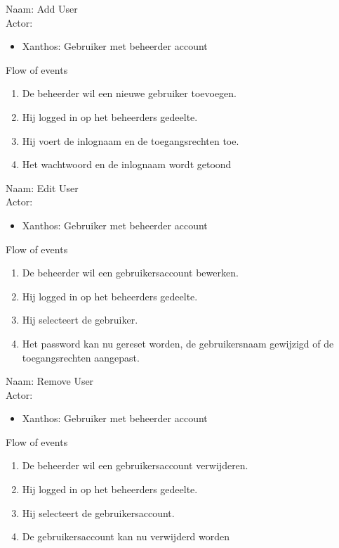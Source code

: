 \item   Naam: Add User  \\
	Actor:
	\begin{itemize}
		\item Xanthos: Gebruiker met beheerder account
	\end{itemize}
	Flow of events
	\begin{enumerate}
	  \item De beheerder wil een nieuwe gebruiker toevoegen.
		\item Hij logged in op het beheerders gedeelte.
		\item Hij voert de inlognaam en de toegangsrechten toe.
		\item Het wachtwoord en de inlognaam wordt getoond
	\end{enumerate}
	


\item   Naam: Edit User  \\
	Actor:
	\begin{itemize}
		\item Xanthos: Gebruiker met beheerder account
	\end{itemize}
	Flow of events
	\begin{enumerate}
	  \item De beheerder wil een gebruikersaccount bewerken.
		\item Hij logged in op het beheerders gedeelte.
		\item Hij selecteert de gebruiker.
		\item Het password kan nu gereset worden, de gebruikersnaam gewijzigd of de toegangsrechten aangepast.
	\end{enumerate}



\item   Naam: Remove User  \\
	Actor:
	\begin{itemize}
		\item Xanthos: Gebruiker met beheerder account
	\end{itemize}
	Flow of events
	\begin{enumerate}
	  \item De beheerder wil een gebruikersaccount verwijderen.
		\item Hij logged in op het beheerders gedeelte.
		\item Hij selecteert de gebruikersaccount.
		\item De gebruikersaccount kan nu verwijderd worden
	\end{enumerate}
	

